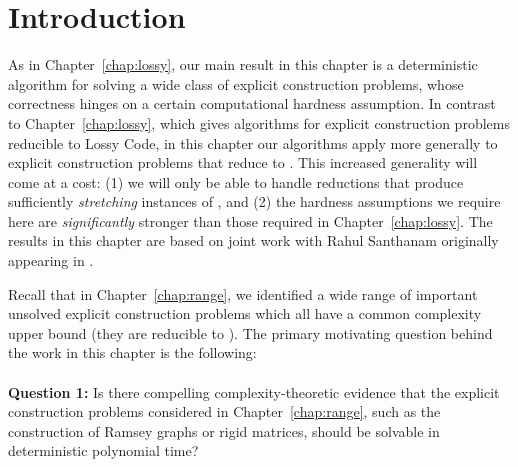 %

\section{Introduction}
As in Chapter~\ref{chap:lossy}, our main result in this chapter is a deterministic algorithm for solving a wide class of explicit construction problems, whose correctness hinges on a certain computational hardness assumption. In contrast to Chapter~\ref{chap:lossy}, which gives algorithms for explicit construction problems reducible to {\sc Lossy Code}, in this chapter our algorithms apply more generally to explicit construction problems that reduce to \avoid. This increased generality will come at a cost: (1) we will only be able to handle reductions that produce sufficiently \emph{stretching} instances of \avoid, and (2) the hardness assumptions we require here are \emph{significantly} stronger than those required in Chapter~\ref{chap:lossy}. The results in this chapter are based on joint work with Rahul Santhanam originally appearing in \cite{KortenSanthanam25}.

Recall that in Chapter~\ref{chap:range}, we identified a wide range of important unsolved explicit construction problems which all have a common complexity upper bound (they are reducible to \avoid). The primary motivating question behind the work in this chapter is the following:\\
\\
{\bf \noindent Question 1:} Is there compelling complexity-theoretic evidence that the explicit construction problems considered in Chapter~\ref{chap:range}, such as the construction of Ramsey graphs or rigid matrices, should be solvable in deterministic polynomial time? \\

